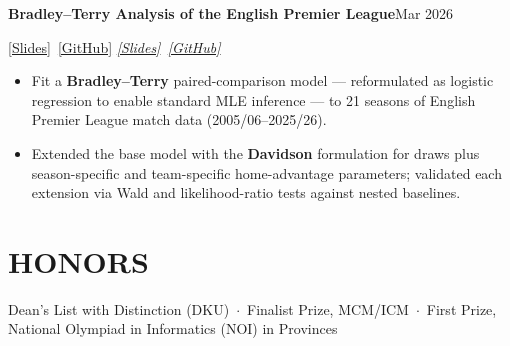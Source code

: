 \documentclass[10pt,letterpaper]{article}
\newcommand{\entry}[4]{%
  \noindent\textbf{\color{ink}#1}\hfill{\color{soft}\small #3}\par%
  \def\tmp{#2}\ifx\tmp\empty\else%
    {\itshape\color{muted}\small #2}\hfill\textit{\color{soft}\small #4}\par%
  \fi%
  \vspace{1pt}%
}
\begin{document}
\vspace{1pt}
\entry{Bradley--Terry Analysis of the English Premier League}{\href{https://docs.google.com/presentation/d/1mncW87F79ezDnqah3qGSjqWAFXMQzGMNqfB2MTYl6jM/edit}{[Slides]} \,\href{https://github.com/cedricshan/Bradley-Terry-Model-Analysis-of-the-English-Premier-League}{[GitHub]}}{Mar 2026}{}
\begin{itemize}
  \item Fit a \textbf{Bradley--Terry} paired-comparison model --- reformulated as logistic regression to enable standard MLE inference --- to 21 seasons of English Premier League match data (2005/06--2025/26).
  \item Extended the base model with the \textbf{Davidson} formulation for draws plus season-specific and team-specific home-advantage parameters; validated each extension via Wald and likelihood-ratio tests against nested baselines.
\end{itemize}


\section{HONORS}
\noindent\footnotesize
Dean's List with Distinction (DKU) \,$\cdot$\, Finalist Prize, MCM/ICM \,$\cdot$\, First Prize, National Olympiad in Informatics (NOI) in Provinces
\end{document}
